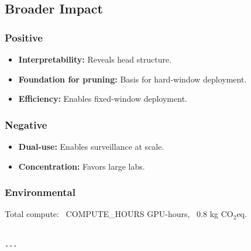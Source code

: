 \subsection{Broader Impact}

\subsubsection{Positive}
\begin{itemize}
\item \textbf{Interpretability:} Reveals head structure.
\item \textbf{Foundation for pruning:} Basis for hard-window deployment.
\item \textbf{Efficiency:} Enables fixed-window deployment.

\end{itemize}
\subsubsection{Negative}
\begin{itemize}
\item \textbf{Dual-use:} Enables surveillance at scale.
\item \textbf{Concentration:} Favors large labs.

\end{itemize}
\subsubsection{Environmental}
Total compute: ~{{COMPUTE\_HOURS}} GPU-hours, ~0.8 kg CO$_2$eq.
\begin{lstlisting}

---
\end{lstlisting}